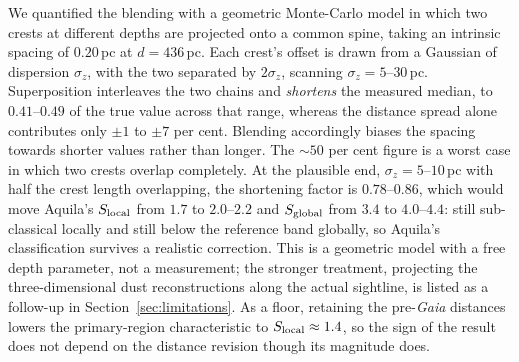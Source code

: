 \documentclass[usenatbib,twoside,twocolumn]{mnras}
\begin{document}
We quantified the blending with a geometric Monte-Carlo model in which two crests at different depths are projected onto a common spine, taking an intrinsic spacing of $0.20$\,pc at $d=436$\,pc. Each crest's offset is drawn from a Gaussian of dispersion $\sigma_z$, with the two separated by $2\sigma_z$, scanning $\sigma_z=5$--$30$\,pc. Superposition interleaves the two chains and \emph{shortens} the measured median, to $0.41$--$0.49$ of the true value across that range, whereas the distance spread alone contributes only $\pm1$ to $\pm7$ per cent. Blending accordingly biases the spacing towards shorter values rather than longer. The $\sim50$ per cent figure is a worst case in which two crests overlap completely. At the plausible end, $\sigma_z=5$--$10$\,pc with half the crest length overlapping, the shortening factor is $0.78$--$0.86$, which would move Aquila's $S_{\rm local}$ from $1.7$ to $2.0$--$2.2$ and $S_{\rm global}$ from $3.4$ to $4.0$--$4.4$: still sub-classical locally and still below the reference band globally, so Aquila's classification survives a realistic correction. This is a geometric model with a free depth parameter, not a measurement; the stronger treatment, projecting the three-dimensional dust reconstructions along the actual sightline, is listed as a follow-up in Section~\ref{sec:limitations}. As a floor, retaining the pre-\textit{Gaia} distances lowers the primary-region characteristic to $S_{\rm local}\approx1.4$, so the sign of the result does not depend on the distance revision though its magnitude does.
\end{document}
